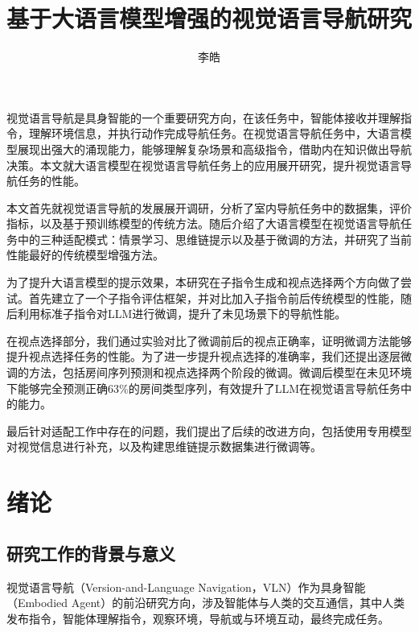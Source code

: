 \documentclass[bachelor]{thesis-uestc}
\title{基于大语言模型增强的视觉语言导航研究}{TODO}
\author{李皓}{Li Hao}
\begin{document}
\makecover

\begin{chineseabstract}
视觉语言导航是具身智能的一个重要研究方向，在该任务中，智能体接收并理解指令，理解环境信息，并执行动作完成导航任务。在视觉语言导航任务中，大语言模型展现出强大的涌现能力，能够理解复杂场景和高级指令，借助内在知识做出导航决策。本文就大语言模型在视觉语言导航任务上的应用展开研究，提升视觉语言导航任务的性能。

本文首先就视觉语言导航的发展展开调研，分析了室内导航任务中的数据集，评价指标，以及基于预训练模型的传统方法。随后介绍了大语言模型在视觉语言导航任务中的三种适配模式：情景学习、思维链提示以及基于微调的方法，并研究了当前性能最好的传统模型增强方法。

为了提升大语言模型的提示效果，本研究在子指令生成和视点选择两个方向做了尝试。首先建立了一个子指令评估框架，并对比加入子指令前后传统模型的性能，随后利用标准子指令对LLM进行微调，提升了未见场景下的导航性能。

在视点选择部分，我们通过实验对比了微调前后的视点正确率，证明微调方法能够提升视点选择任务的性能。为了进一步提升视点选择的准确率，我们还提出逐层微调的方法，包括房间序列预测和视点选择两个阶段的微调。微调后模型在未见环境下能够完全预测正确$63\%$的房间类型序列，有效提升了LLM在视觉语言导航任务中的能力。

最后针对适配工作中存在的问题，我们提出了后续的改进方向，包括使用专用模型对视觉信息进行补充，以及构建思维链提示数据集进行微调等。

\end{chineseabstract}

\begin{englishabstract}

\englishkeyword{}
\end{englishabstract}

\thesistableofcontents

\chapter{绪\hspace{6pt}论}

\section{研究工作的背景与意义}

视觉语言导航（Version-and-Language Navigation，VLN）作为具身智能（Embodied Agent）的前沿研究方向，涉及智能体与人类的交互通信，其中人类发布指令，智能体理解指令，观察环境，导航或与环境互动，最终完成任务。
\end{document}
